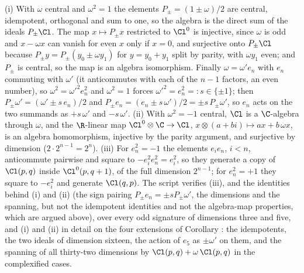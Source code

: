 (i) With $\omega$ central and $\omega^{2} = 1$ the elements $P_{\pm} = (1 \pm \omega)/2$ are central, idempotent, orthogonal and sum to one, so the algebra is the direct sum of the ideals $P_{\pm}\Cl$. The map $x \mapsto P_{\pm}x$ restricted to $\Cl^{0}$ is injective, since $\omega$ is odd and $x - \omega x$ can vanish for even $x$ only if $x = 0$, and surjective onto $P_{\pm}\Cl$ because $P_{\pm}y = P_{\pm}(y_{0} \pm \omega y_{1})$ for $y = y_{0} + y_{1}$ split by parity, with $\omega y_{1}$ even; and $P_{\pm}$ is central, so the map is an algebra isomorphism. Finally $\omega = \omega' e_{n}$ with $e_{n}$ commuting with $\omega'$ (it anticommutes with each of the $n - 1$ factors, an even number), so $\omega^{2} = \omega'^{2}e_{n}^{2}$ and $\omega^{2} = 1$ forces $\omega'^{2} = e_{n}^{2} =: s \in \{\pm 1\}$; then $P_{\pm}\omega' = (\omega' \pm s\,e_{n})/2$ and $P_{\pm}e_{n} = (e_{n} \pm s\,\omega')/2 = \pm s\,P_{\pm}\omega'$, so $e_{n}$ acts on the two summands as $+s\,\omega'$ and $-s\,\omega'$. (ii) With $\omega^{2} = -1$ central, $\Cl$ is a $\C$-algebra through $\omega$, and the $\R$-linear map $\Cl^{0} \otimes \C \to \Cl$, $x \otimes (a + bi) \mapsto ax + b\,\omega x$, is an algebra homomorphism, injective by the parity argument, and surjective by dimension ($2 \cdot 2^{n-1} = 2^{n}$). (iii) For $e_{n}^{2} = -1$ the elements $e_{i}e_{n}$, $i < n$, anticommute pairwise and square to $-e_{i}^{2}e_{n}^{2} = e_{i}^{2}$, so they generate a copy of $\Cl(p,q)$ inside $\Cl^{0}(p, q+1)$, of the full dimension $2^{n-1}$; for $e_{n}^{2} = +1$ they square to $-e_{i}^{2}$ and generate $\Cl(q,p)$. The script verifies (iii), and the identities behind (i) and (ii) (the sign pairing $P_{\pm}e_{n} = \pm s P_{\pm}\omega'$, the dimensions and the spanning, but not the idempotent identities and not the algebra-map properties, which are argued above), over every odd signature of dimensions three and five, and (i) and (ii) in detail on the four extensions of Corollary : the idempotents, the two ideals of dimension sixteen, the action of $e_{5}$ as $\pm\omega'$ on them, and the spanning of all thirty-two dimensions by $\Cl(p,q) + \omega\,\Cl(p,q)$ in the complexified cases.
